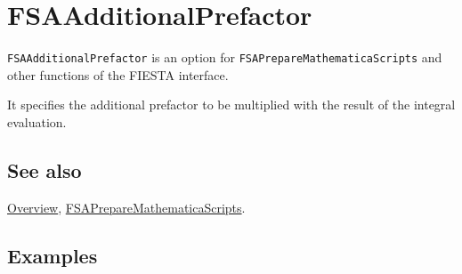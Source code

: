 \documentclass[../FeynHelpersManual.tex]{subfiles}
\begin{document}
\hypertarget{fsaadditionalprefactor}{
\section{FSAAdditionalPrefactor}\label{fsaadditionalprefactor}}

\texttt{FSAAdditionalPrefactor} is an option for
\texttt{FSAPrepareMathematicaScripts} and other functions of the FIESTA
interface.

It specifies the additional prefactor to be multiplied with the result
of the integral evaluation.

\subsection{See also}

\hyperlink{toc}{Overview},
\hyperlink{fsapreparemathematicascripts}{FSAPrepareMathematicaScripts}.

\subsection{Examples}
\end{document}
